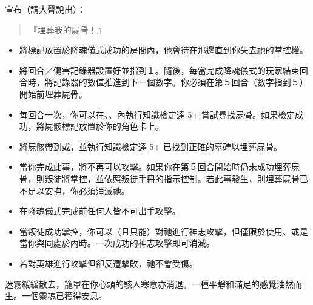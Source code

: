 宣布（請大聲說出）：
\begin{quote}
  『埋葬我的屍骨！』
\end{quote}
\vspace*{-1em}
\begin{itemize}
  \item 將標記放置於降魂儀式成功的房間內，他會待在那邊直到你失去祂的掌控權。
  \item 將回合／傷害記錄器設置好並指到１。隨後，每當完成降魂儀式的玩家結束回合時，將記錄器的數值推進到下一個數字。你必須在第５回合（數字指到５）開始前埋葬屍骨。
  \item 每回合一次，你可以在、、內執行知識檢定達 5+ 嘗試尋找屍骨。如果檢定成功，將屍骸標記放置於你的角色卡上。
  \item 將屍骸帶到或，並執行知識檢定達 5+ 已找到正確的墓碑以埋葬屍骨。
  \item 當你完成此事，將不再可以攻擊。如果你在第５回合開始時仍未成功埋葬屍骨，則叛徒將掌控，並依照叛徒手冊的指示控制。若此事發生，則埋葬屍骨已不足以安撫，你必須消滅祂。
\end{itemize}

\vspace*{-1em}
\begin{itemize}
  \item 在降魂儀式完成前任何人皆不可出手攻擊。
  \item 當叛徒成功掌控，你可以（且只能）對祂進行神志攻擊，但僅限於使用、或是當你與同處於內時。一次成功的神志攻擊即可消滅。
  \item 若對英雄進行攻擊但卻反遭擊敗，祂不會受傷。
\end{itemize}

\begin{HauntStory}
  迷霧緩緩散去，籠罩在你心頭的駭人寒意亦消退。一種平靜和滿足的感覺油然而生。一個靈魂已獲得安息。
\end{HauntStory}
